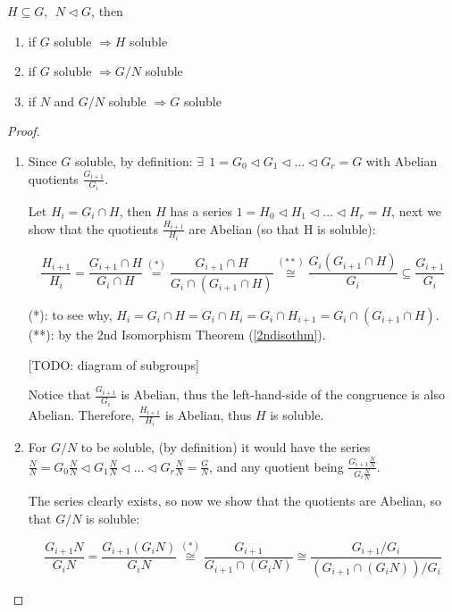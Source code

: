 \documentclass{article}
\theoremstyle{definition}
\newenvironment{thm}[1]
{\renewcommand\theinnerthm{#1}\innerthm}
{\endinnerthm}
\begin{document}
\begin{thm}{14.4}
  $H \subseteq G,~~ N \triangleleft G$, then
  \begin{enumerate}
    \item if $G$ soluble $\Longrightarrow H$ soluble
    \item if $G$ soluble $\Longrightarrow G/N$ soluble
    \item if $N$ and $G/N$ soluble $\Longrightarrow G$ soluble
  \end{enumerate}
\end{thm}
\begin{proof}
  \begin{enumerate}
    \item Since $G$ soluble, by definition: $\exists~~ 1=G_0 \triangleleft G_1 \triangleleft \ldots \triangleleft G_r = G$ with Abelian quotients $\frac{G_{i+1}}{G_i}$.

      Let $H_i = G_i \cap H$, then $H$ has a series $1=H_0 \triangleleft H_1
      \triangleleft \ldots \triangleleft H_r = H$, next we show that the
      quotients $\frac{H_{i+1}}{H_i}$ are Abelian (so that H is soluble):

      $$\frac{H_{i+1}}{H_i} = \frac{G_{i+1} \cap H}{G_i \cap H} \stackrel{(*)}{=} \frac{G_{i+1} \cap H}{G_i \cap (G_{i+1}\cap H)}
      \stackrel{(**)}{\cong} \frac{G_i(G_{i+1} \cap H)}{G_i} \subseteq \frac{G_{i+1}}{G_i}
      $$

      (*): to see why, $H_i = G_i \cap H = G_i \cap H_i = G_i \cap H_{i+1} = G_i \cap (G_{i+1} \cap H)$.
      (**): by the 2nd Isomorphism Theorem (\ref{2ndisothm}).

      [TODO: diagram of subgroups] %
      
      Notice that $\frac{G_{i+1}}{G_i}$ is Abelian, thus the left-hand-side of the congruence is also Abelian.
      Therefore, $\frac{H_{i+1}}{H_i}$ is Abelian, thus $H$ is soluble.

    \item For $G/N$ to be soluble, (by definition) it would have the series $\frac{N}{N} = G_0 \frac{N}{N} \triangleleft G_1 \frac{N}{N} \triangleleft \ldots \triangleleft G_r \frac{N}{N} = \frac{G}{N}$,
      and any quotient being $\frac{G_{i+1}\frac{N}{N}}{G_i \frac{N}{N}}$.

      The series clearly exists, so now we show that the quotients are Abelian, so that $G/N$ is soluble:

      $$
      \frac{G_{i+1} N}{G_i N} = \frac{G_{i+1}(G_i N)}{G_i N} \stackrel{(*)}{\cong}
      \frac{G_{i+1}}{G_{i+1} \cap (G_i N)} \cong \frac{G_{i+1}/G_i}{(G_{i+1}
      \cap (G_i N))/G_i}
      $$


\end{enumerate}
\end{proof}
\end{document}
